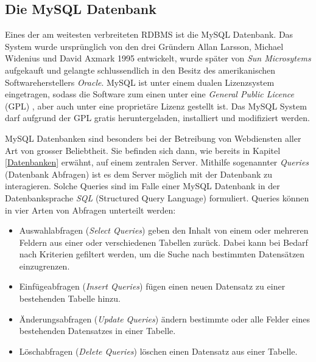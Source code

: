 \documentclass[../main.tex]{subfiles}
\begin{document}
	\subsection{Die MySQL Datenbank}
	Eines der am weitesten verbreiteten RDBMS ist die MySQL Datenbank. Das System wurde ursprünglich von den drei Gründern Allan Larsson, Michael Widenius und David Axmark 1995 entwickelt, wurde später von \emph{Sun Microsytems} aufgekauft und gelangte schlussendlich in den Besitz des amerikanischen Softwareherstellers \emph{Oracle}. MySQL ist unter einem dualen Lizenzsystem eingetragen, sodass die Software zum einen unter eine \emph{General Public Licence} (GPL) \cite{GPL}, aber auch unter eine proprietäre Lizenz \cite{proprietaereLizenz} gestellt ist. \cite{tecmint.com} Das MySQL System darf aufgrund der GPL gratis heruntergeladen, installiert und modifiziert werden.
	
	MySQL Datenbanken sind besonders bei der Betreibung von Webdiensten aller Art von grosser Beliebtheit. Sie befinden sich dann, wie bereits in Kapitel \ref{Datenbanken} erwähnt, auf einem zentralen Server. Mithilfe sogenannter \emph{Queries} (Datenbank Abfragen) ist es dem Server möglich mit der Datenbank zu interagieren. Solche Queries sind im Falle einer MySQL Datenbank in der Datenbanksprache \emph{SQL} (Structured Query Language) formuliert. Queries können in vier Arten von Abfragen unterteilt werden: \cite[S. 760]{IT-Handbuch}
	
	\begin{itemize}
		\item Auswahlabfragen (\emph{Select Queries}) geben den Inhalt von einem oder mehreren Feldern aus einer oder verschiedenen Tabellen zurück. Dabei kann bei Bedarf nach Kriterien gefiltert werden, um die Suche nach bestimmten Datensätzen einzugrenzen.\cite[S. 746]{IT-Handbuch}
		\item Einfügeabfragen (\emph{Insert Queries}) fügen einen neuen Datensatz zu einer bestehenden Tabelle hinzu. \cite[S. 746]{IT-Handbuch}
		\item Änderungsabfragen (\emph{Update Queries}) ändern bestimmte oder alle Felder eines bestehenden Datensatzes in einer Tabelle. \cite[S. 746]{IT-Handbuch}
		\item Löschabfragen (\emph{Delete Queries}) löschen einen Datensatz aus einer Tabelle. \cite[S. 746]{IT-Handbuch}
	\end{itemize}
	
\end{document}
